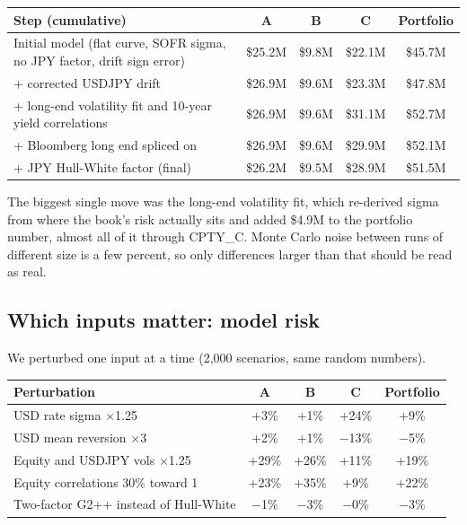 \documentclass[11pt,letterpaper]{article}
\begin{document}
\begin{center}
\small
\begin{tabular}{@{}p{7.4cm}cccc@{}}
\toprule
\textbf{Step (cumulative)} & \textbf{A} & \textbf{B} & \textbf{C} & \textbf{Portfolio}\\
\midrule
Initial model (flat curve, SOFR sigma, no JPY factor, drift sign error) & \$25.2M & \$9.8M & \$22.1M & \$45.7M\\
+ corrected USDJPY drift & \$26.9M & \$9.6M & \$23.3M & \$47.8M\\
+ long-end volatility fit and 10-year yield correlations & \$26.9M & \$9.6M & \$31.1M & \$52.7M\\
+ Bloomberg long end spliced on & \$26.9M & \$9.6M & \$29.9M & \$52.1M\\
+ JPY Hull-White factor (final) & \$26.2M & \$9.5M & \$28.9M & \$51.5M\\
\bottomrule
\end{tabular}
\end{center}

The biggest single move was the long-end volatility fit, which re-derived sigma from where the book's risk actually sits and added \$4.9M to the portfolio number, almost all of it through CPTY\_C. Monte Carlo noise between runs of different size is a few percent, so only differences larger than that should be read as real.

\subsection{Which inputs matter: model risk}
We perturbed one input at a time (2,000 scenarios, same random numbers).

\begin{center}
\small
\begin{tabular}{@{}lcccc@{}}
\toprule
\textbf{Perturbation} & \textbf{A} & \textbf{B} & \textbf{C} & \textbf{Portfolio}\\
\midrule
USD rate sigma $\times$1.25 & +3\% & +1\% & +24\% & +9\%\\
USD mean reversion $\times$3 & +2\% & +1\% & $-$13\% & $-$5\%\\
Equity and USDJPY vols $\times$1.25 & +29\% & +26\% & +11\% & +19\%\\
Equity correlations 30\% toward 1 & +23\% & +35\% & +9\% & +22\%\\
Two-factor G2++ instead of Hull-White & $-$1\% & $-$3\% & $-$0\% & $-$3\%\\
\bottomrule
\end{tabular}
\end{center}
\end{document}
